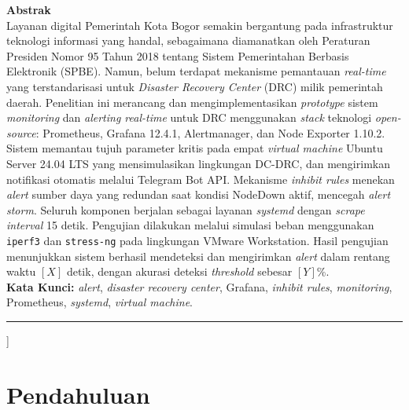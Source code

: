 \documentclass[10pt,twocolumn]{article}
\begin{document}
{\begin{@twocolumnfalse}
  \noindent\textbf{Abstrak}\\[4pt]
  \noindent\small
  Layanan digital Pemerintah Kota Bogor semakin bergantung pada infrastruktur teknologi informasi
  yang handal, sebagaimana diamanatkan oleh Peraturan Presiden Nomor 95 Tahun 2018 tentang Sistem
  Pemerintahan Berbasis Elektronik (SPBE). Namun, belum terdapat mekanisme pemantauan
  \textit{real-time} yang terstandarisasi untuk \textit{Disaster Recovery Center} (DRC) milik
  pemerintah daerah. Penelitian ini merancang dan mengimplementasikan \textit{prototype} sistem
  \textit{monitoring} dan \textit{alerting real-time} untuk DRC menggunakan \textit{stack} teknologi
  \textit{open-source}: Prometheus, Grafana 12.4.1, Alertmanager, dan Node Exporter 1.10.2. Sistem
  memantau tujuh parameter kritis pada empat \textit{virtual machine} Ubuntu Server 24.04 LTS yang
  mensimulasikan lingkungan DC-DRC, dan mengirimkan notifikasi otomatis melalui Telegram Bot API.
  Mekanisme \textit{inhibit rules} menekan \textit{alert} sumber daya yang redundan saat kondisi
  NodeDown aktif, mencegah \textit{alert storm}. Seluruh komponen berjalan sebagai layanan
  \textit{systemd} dengan \textit{scrape interval} 15 detik. Pengujian dilakukan melalui simulasi
  beban menggunakan \texttt{iperf3} dan \texttt{stress-ng} pada lingkungan VMware Workstation. Hasil
  pengujian menunjukkan sistem berhasil mendeteksi dan mengirimkan \textit{alert} dalam rentang waktu
  $[\mathit{X}]$ detik, dengan akurasi deteksi \textit{threshold} sebesar $[\mathit{Y}]$\%.\\[4pt]

  \noindent\textbf{Kata Kunci:} \textit{alert}, \textit{disaster recovery center}, Grafana,
  \textit{inhibit rules}, \textit{monitoring}, Prometheus, \textit{systemd},
  \textit{virtual machine}.

  \vspace{8pt}
  \hrule
  \vspace{10pt}

\end{@twocolumnfalse}
}]

\section{Pendahuluan}
\end{document}
